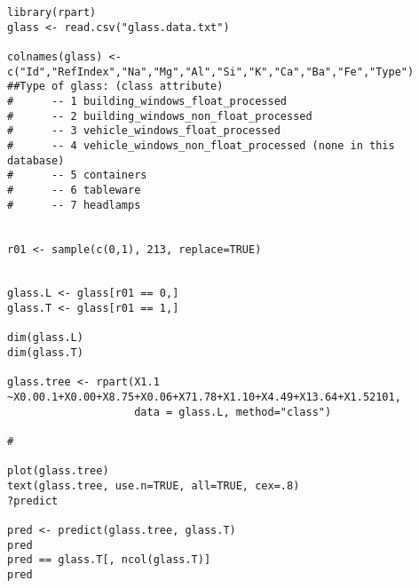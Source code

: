 \documentclass[bigger]{beamer}
\begin{document}
\begin{verbatim}
library(rpart) 
glass <- read.csv("glass.data.txt")

colnames(glass) <- c("Id","RefIndex","Na","Mg","Al","Si","K","Ca","Ba","Fe","Type")
##Type of glass: (class attribute)
#      -- 1 building_windows_float_processed
#      -- 2 building_windows_non_float_processed
#      -- 3 vehicle_windows_float_processed
#      -- 4 vehicle_windows_non_float_processed (none in this database)
#      -- 5 containers
#      -- 6 tableware
#      -- 7 headlamps


r01 <- sample(c(0,1), 213, replace=TRUE)


glass.L <- glass[r01 == 0,]
glass.T <- glass[r01 == 1,]

dim(glass.L)
dim(glass.T)

glass.tree <- rpart(X1.1 ~X0.00.1+X0.00+X8.75+X0.06+X71.78+X1.10+X4.49+X13.64+X1.52101,
                    data = glass.L, method="class")

#

plot(glass.tree)
text(glass.tree, use.n=TRUE, all=TRUE, cex=.8)
?predict

pred <- predict(glass.tree, glass.T)
pred
pred == glass.T[, ncol(glass.T)]
pred
\end{verbatim}
\end{document}
